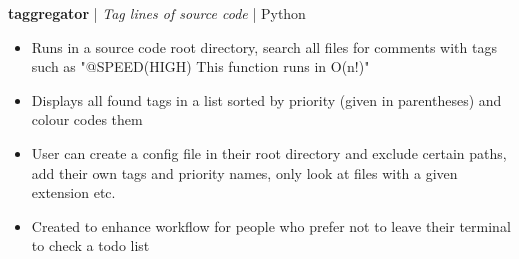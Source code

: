 \textbf{taggregator} | \textit{Tag lines of source code} | {Python}
\begin{itemize}
    \item Runs in a source code root directory, search all files for comments with tags such as "@SPEED(HIGH) This function runs in O(n!)"
    \item Displays all found tags in a list sorted by priority (given in parentheses) and colour codes them
    \item User can create a config file in their root directory and exclude certain paths, add their own tags and priority names, only look at files with a given extension etc.
    \item Created to enhance workflow for people who prefer not to leave their terminal to check a todo list
\end{itemize}
